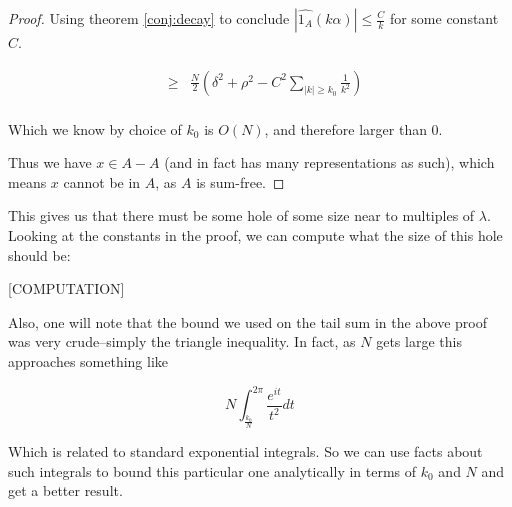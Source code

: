 \documentclass{article}
\theoremstyle{definition}
\theoremstyle{remark}
\numberwithin{equation}{section}
\begin{document}
\begin{proof}
  Using theorem \ref{conj:decay} to conclude
  $|\widehat{1_A}(k\alpha)| \leq \frac{C}{k}$ for some constant $C$.

  \begin{eqnarray*}
    &\geq& \frac{N}{2}\left(\delta^2 + \rho^2 - C^2 \sum_{|k| \geq k_0} \frac{1}{k^2}\right)\\
  \end{eqnarray*}
  
  Which we know by choice of $k_0$ is $O(N)$, and therefore larger
  than 0.

  Thus we have $x \in A - A$ (and in fact has many representations as
  such), which means $x$ cannot be in $A$, as $A$ is sum-free.
\end{proof}

This gives us that there must be some hole of some size near to
multiples of $\lambda$.  Looking at the constants in the proof, we can
compute what the size of this hole should be: 

{\color{red}

[COMPUTATION]

Also, one will note that the bound we used on the tail sum in the
above proof was very crude--simply the triangle inequality.  In fact,
as $N$ gets large this approaches something like

\[N \int_{\frac{k_0}{N}}^{2\pi} \frac{e^{it}}{t^2}dt\]

Which is related to standard exponential integrals.  So we can use
facts about such integrals to bound this particular one analytically
in terms of $k_0$ and $N$ and get a better result.

}



\end{document}
